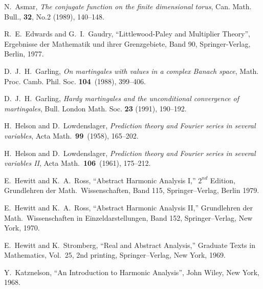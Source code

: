 \begin{thebibliography}{Dillo 83}

  N.\ Asmar, 
{\em The conjugate function on the finite dimensional torus}, 
Can. Math. Bull.,
{\bf 32}, No.2 (1989), 140--148.

  R.\ E.\ Edwards and G.\ I.\ Gaudry,
``Littlewood-Paley and Multiplier Theory'',
Ergebnisse der Mathematik und ihrer Grenzgebiete,
Band 90, Springer-Verlag, Berlin, 1977.

 D.\ J.\ H.\ Garling, 
{\em On martingales with values in a complex Banach space},
Math. Proc. Camb. Phil. Soc. {\bf 104}\ (1988), 399--406.

 D.\ J.\ H.\ Garling, 
{\em Hardy martingales and the unconditional 
convergence of martingales},
Bull. London Math. Soc. {\bf 23} (1991), 190--192.

  H.\ Helson and D.\ Lowdenslager,
{\em Prediction theory and Fourier series in several variables}, 
Acta Math.\ {\bf 99}\ (1958), 165--202.

  H.\ Helson and D.\ Lowdenslager,
{\em Prediction theory and Fourier series in several variables II}, 
Acta Math.\ {\bf 106}\ (1961), 175--212.

 E.\ Hewitt and K.\ A.\ Ross,
``Abstract Harmonic Analysis I,''  $2^{nd}$ Edition, Grundlehren der
Math.\ Wissenschaften, Band 115, Springer--Verlag, Berlin 1979.

 E.\ Hewitt and K.\ A.\ Ross,
``Abstract Harmonic Analysis II,'' Grundlehren der
Math.\ Wissenschaften in Einzeldarstellungen, Band
152, Springer--Verlag, New York, 1970.

 E.\ Hewitt and K.\ Stromberg,
``Real and Abstract Analysis,'' 
Graduate Texts in Mathematics, Vol.\ 25, 2nd printing,
 Springer--Verlag, New York, 1969.

 Y.\ Katznelson, ``An Introduction to Harmonic Analysis'',
John Wiley, New York, 1968. 
\end{thebibliography}












